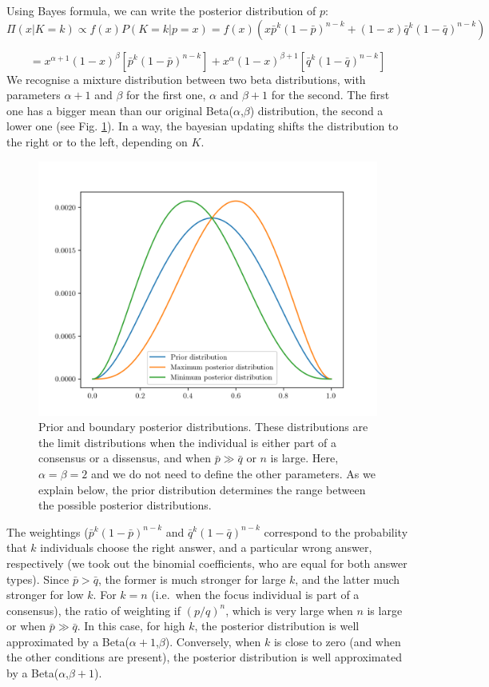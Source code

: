 \documentclass[
  doc,floatsintext]{apa6}
\begin{document}
Using Bayes formula, we can write the posterior distribution of \(p\):
\[
\Pi(x|K=k) \propto f(x)P(K=k|p=x) = f(x)(x\bar p^k(1-\bar p)^{n-k} + (1-x)\bar q^k (1-\bar q)^{n-k})
\]

\[
= x^{\alpha+1}(1-x)^\beta[\bar p^k(1-\bar p)^{n-k}] + x^{\alpha}(1-x)^{\beta+1} [\bar q^k (1-\bar q)^{n-k}]
\]
We recognise a mixture distribution between two beta distributions, with parameters \(\alpha+1\) and \(\beta\) for the first one, \(\alpha\) and \(\beta + 1\) for the second. The first one has a bigger mean than our original Beta(\(\alpha\),\(\beta\)) distribution, the second a lower one (see Fig. \ref{fig:posterior}). In a way, the bayesian updating shifts the distribution to the right or to the left, depending on \(K\).



\begin{figure}

\includegraphics[width=0.75\linewidth]{figures/Benoit_posterior} \hfill{}

\caption{Prior and boundary posterior distributions. These distributions are the limit distributions when the individual is either part of a consensus or a dissensus, and when \(\bar p \gg \bar q\) or \(n\) is large. Here, \(\alpha=\beta=2\) and we do not need to define the other parameters. As we explain below, the prior distribution determines the range between the possible posterior distributions.}\label{fig:posterior}
\end{figure}

The weightings (\(\bar p^k(1-\bar p)^{n-k}\) and \(\bar q^k (1-\bar q)^{n-k}\) correspond to the probability that \(k\) individuals choose the right answer, and a particular wrong answer, respectively (we took out the binomial coefficients, who are equal for both answer types). Since \(\bar p > \bar q\), the former is much stronger for large \(k\), and the latter much stronger for low \(k\). For \(k=n\) (i.e.~when the focus individual is part of a consensus), the ratio of weighting if \((p/q)^n\), which is very large when \(n\) is large or when \(\bar p \gg \bar q\). In this case, for high \(k\), the posterior distribution is well approximated by a Beta(\(\alpha+1\),\(\beta\)). Conversely, when \(k\) is close to zero (and when the other conditions are present), the posterior distribution is well approximated by a Beta(\(\alpha\),\(\beta+1\)).
\end{document}

